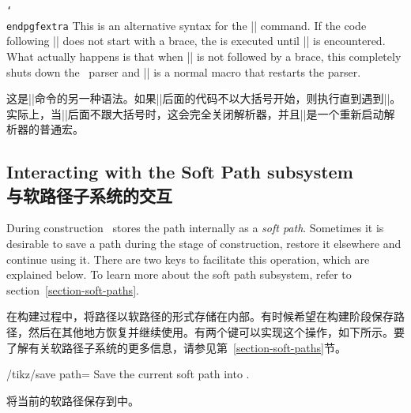 \begin{command}{\pgfextra {} \texttt{\char`\\endpgfextra}}
    This is an alternative syntax for the |\pgfextra| command. If the code
    following |\pgfextra| does not start with a brace, the  is
    executed until |\endpgfextra| is encountered. What actually happens is that
    when |\pgfextra| is not followed by a brace, this completely shuts down the
    \tikzname\ parser and |\endpgfextra| is a normal macro that restarts the
    parser.
    
    这是|\pgfextra|命令的另一种语法。如果|\pgfextra|后面的代码不以大括号开始，则执行直到遇到|\endpgfextra|。实际上，当|\pgfextra|后面不跟大括号时，这会完全关闭\tikzname 解析器，并且|\endpgfextra|是一个重新启动解析器的普通宏。

\begin{codeexample}[]
\newdimen\mydim
\begin{tikzpicture}
  \mydim=1cm
  \draw (0pt,\mydim)
    \pgfextra \mydim=2cm \endpgfextra -- (0pt,\mydim);
\end{tikzpicture}
\end{codeexample}
\end{command}


\subsection{Interacting with the Soft Path subsystem\\与软路径子系统的交互}

During construction \tikzname\ stores the path internally as a \emph{soft
path}. Sometimes it is desirable to save a path during the stage of
construction, restore it elsewhere and continue using it. There are two keys to
facilitate this operation, which are explained below. To learn more about the
soft path subsystem, refer to section~\ref{section-soft-paths}.

在构建过程中，\tikzname 将路径以软路径的形式存储在内部。有时候希望在构建阶段保存路径，然后在其他地方恢复并继续使用。有两个键可以实现这个操作，如下所示。要了解有关软路径子系统的更多信息，请参见第~\ref{section-soft-paths}节。

\begin{key}{/tikz/save path=}
    Save the current soft path into .

    将当前的软路径保存到中。

\end{key}

